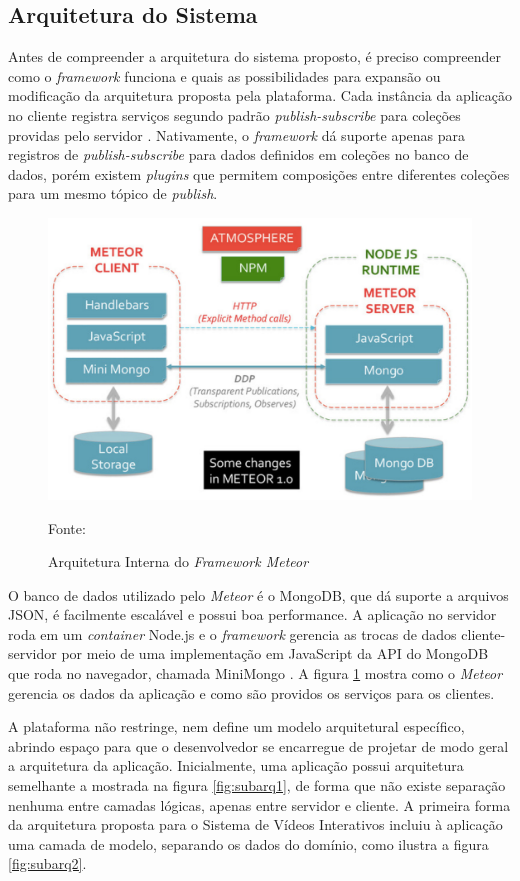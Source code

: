 \subsection{Arquitetura do Sistema}

Antes de compreender a arquitetura do sistema proposto, é preciso compreender como o \textit{framework} funciona e quais as possibilidades para expansão ou modificação da arquitetura proposta pela plataforma. Cada instância da aplicação no cliente registra serviços segundo padrão \textit{publish-subscribe} para coleções providas pelo servidor \cite{casciaro2014}. Nativamente, o \textit{framework} dá suporte apenas para registros de \textit{publish-subscribe} para dados definidos em coleções no banco de dados, porém existem \textit{plugins} que permitem composições entre diferentes coleções para um mesmo tópico de \textit{publish}.

\begin{figure}[h!]
	\centering
	\includegraphics[width=.65\linewidth]{figuras/meteorarq.eps}	
  	\caption{Arquitetura Interna do \textit{Framework Meteor}}
	\small{Fonte: \cite{mongodb2015}}
  	\label{fig:meteorarq}
\end{figure}

O banco de dados utilizado pelo \textit{Meteor} é o MongoDB, que dá suporte a arquivos JSON, é facilmente escalável e possui boa performance. A aplicação no servidor roda em um \textit{container} Node.js e o \textit{framework} gerencia as trocas de dados cliente-servidor por meio de uma implementação em JavaScript da API do MongoDB que roda no navegador, chamada MiniMongo \cite{mongodb2015}. A figura \ref{fig:meteorarq} mostra como o \textit{Meteor}  gerencia os dados da aplicação e como são providos os serviços para os clientes. 

A plataforma não restringe, nem define um modelo arquitetural específico, abrindo espaço para que o desenvolvedor se encarregue de projetar de modo geral a arquitetura da aplicação. Inicialmente, uma aplicação possui arquitetura semelhante a mostrada na figura \ref{fig:subarq1}, de forma que não existe separação nenhuma entre camadas lógicas, apenas entre servidor e cliente. A primeira forma da arquitetura proposta para o Sistema de Vídeos Interativos incluiu à aplicação uma camada de modelo, separando os dados do domínio, como ilustra a figura \ref{fig:subarq2}.

